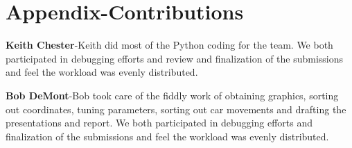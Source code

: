 \documentclass{article}
\begin{document}
\begin{multicols}{2}
\begin{thebibliography}{10}
\end{thebibliography}
\pagebreak
\section*{Appendix-Contributions}
\noindent \textbf{Keith Chester}-Keith did most of the Python coding for the team.  We both participated in debugging efforts and review and finalization of the submissions and feel the workload was evenly distributed.
\bigskip

\noindent \textbf{Bob DeMont}-Bob took care of the fiddly work of obtaining graphics, sorting out coordinates, tuning parameters, sorting out car movements and drafting the presentations and report.  We both participated in debugging efforts and finalization of the submissions and feel the workload was evenly distributed.
 
 

\end{multicols}
\end{document}
